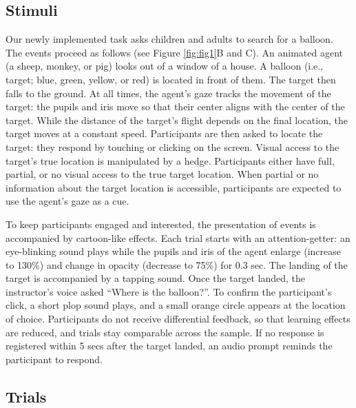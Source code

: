 \documentclass[
  man,floatsintext]{apa6}
\begin{document}
\hypertarget{stimuli}{%
\subsection{Stimuli}\label{stimuli}}

Our newly implemented task asks children and adults to search for a balloon.
The events proceed as follows (see Figure \ref{fig:fig1}B and C).
An animated agent (a sheep, monkey, or pig) looks out of a window of a house.
A balloon (i.e., target; blue, green, yellow, or red) is located in front of them.
The target then falls to the ground.
At all times, the agent's gaze tracks the movement of the target: the pupils and iris move so that their center aligns with the center of the target.
While the distance of the target's flight depends on the final location, the target moves at a constant speed.
Participants are then asked to locate the target: they respond by touching or clicking on the screen.
Visual access to the target's true location is manipulated by a hedge.
Participants either have full, partial, or no visual access to the true target location.
When partial or no information about the target location is accessible, participants are expected to use the agent's gaze as a cue.

To keep participants engaged and interested, the presentation of events is accompanied by cartoon-like effects.
Each trial starts with an attention-getter: an eye-blinking sound plays while the pupils and iris of the agent enlarge (increase to 130\%) and change in opacity (decrease to 75\%) for 0.3 sec.
The landing of the target is accompanied by a tapping sound.
Once the target landed, the instructor's voice asked ``Where is the balloon?''.
To confirm the participant's click, a short plop sound plays, and a small orange circle appears at the location of choice.
Participants do not receive differential feedback, so that learning effects are reduced, and trials stay comparable across the sample.
If no response is registered within 5 secs after the target landed, an audio prompt reminds the participant to respond.

\hypertarget{trials}{%
\subsection{Trials}\label{trials}}
\end{document}

